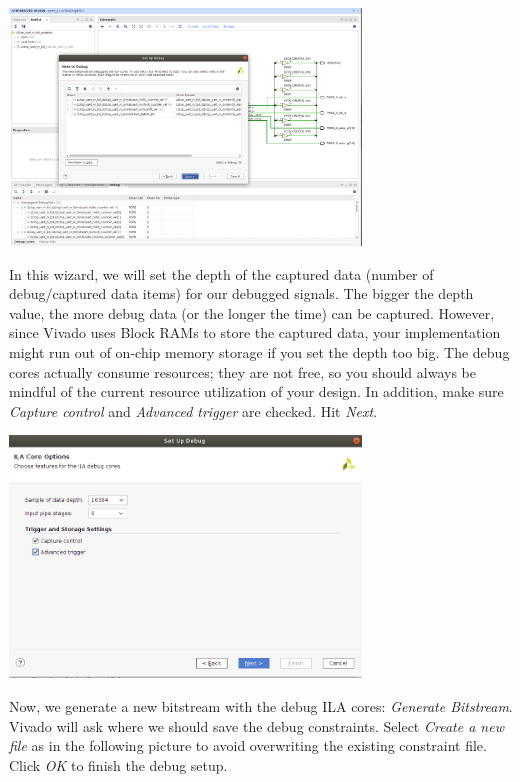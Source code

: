 \documentclass[11pt]{article}
\begin{document}
\begin{center}
\includegraphics[width=0.7\textwidth]{figs/vivado-ila-2.png}
\end{center}

In this wizard, we will set the depth of the captured data (number of debug/captured data items) for our debugged signals. The bigger the depth value, the more debug data (or the longer the time) can be captured. However, since Vivado uses Block RAMs to store the captured data, your implementation might run out of on-chip memory storage if you set the depth too big. The debug cores actually consume resources; they are not free, so you should always be mindful of the current resource utilization of your design. In addition, make sure \emph{Capture control} and \emph{Advanced trigger} are checked. Hit \emph{Next}.

\begin{center}
\includegraphics[width=0.7\textwidth]{figs/vivado-ila-3.png}
\end{center}
Now, we generate a new bitstream with the debug ILA cores: \emph{Generate Bitstream}. Vivado will ask  where we should save the debug constraints. Select \emph{Create a new file} as in the following picture to avoid overwriting the existing constraint file. Click \emph{OK} to finish the debug setup. 
\end{document}

